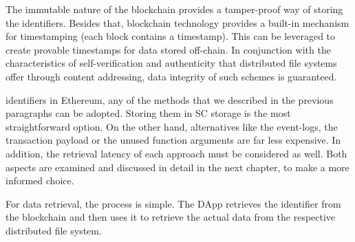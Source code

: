 The immutable nature of the blockchain provides a tamper-proof way of storing the identifiers. Besides that, blockchain technology provides a built-in mechanism for timestamping (each block contains a timestamp). This can be leveraged to create provable timestamps for data stored off-chain. In conjunction with the characteristics of self-verification and authenticity that distributed file systems offer through content addressing, data integrity of such schemes is guaranteed.

 identifiers in Ethereum, any of the methods that we described in the previous paragraphs can be adopted. Storing them in SC storage is the most straightforward option. On the other hand, alternatives like the event-logs, the transaction payload or the unused function arguments are far less expensive. In addition, the retrieval latency of each approach must be considered as well. Both aspects are examined and discussed in detail in the next chapter,  to make a more informed choice.

For data retrieval, the process is simple. The DApp retrieves the identifier from the blockchain and then uses it to retrieve the actual data from the respective distributed file system.
